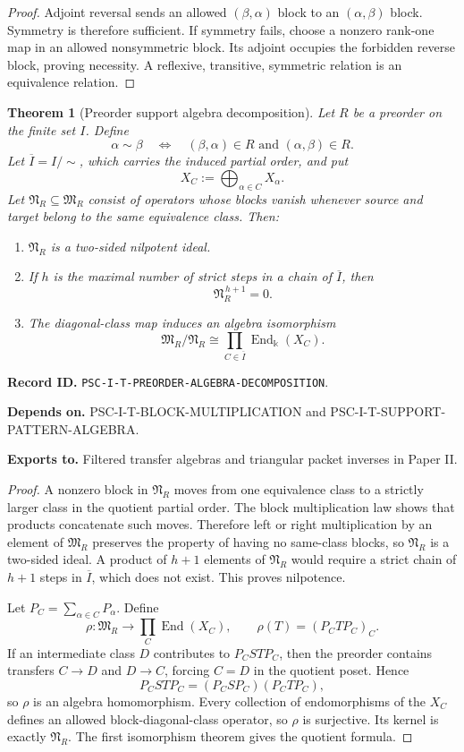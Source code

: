 \documentclass[11pt]{article}
\newtheorem{theorem}{Theorem}[section]
\theoremstyle{definition}
\theoremstyle{remark}
\newcommand{\bbk}{\Bbbk}
\newcommand{\End}{\operatorname{End}}
\newcommand{\RecordID}[1]{\par\smallskip\noindent\begingroup\footnotesize\color{PSCGray}\raggedright\textbf{Record ID.} \nolinkurl{#1}.\par\endgroup}
\newcommand{\Depends}[1]{\par\noindent\begingroup\footnotesize\color{PSCGray}\raggedright\textbf{Depends on.} #1\par\endgroup}
\newcommand{\Exports}[1]{\par\noindent\begingroup\footnotesize\color{PSCGray}\raggedright\textbf{Exports to.} #1\par\endgroup}
\begin{document}
\begin{proof}
Adjoint reversal sends an allowed $(\beta,\alpha)$ block to an $(\alpha,\beta)$ block.  Symmetry is therefore sufficient.  If symmetry fails, choose a nonzero rank-one map in an allowed nonsymmetric block.  Its adjoint occupies the forbidden reverse block, proving necessity.  A reflexive, transitive, symmetric relation is an equivalence relation.
\end{proof}

\begin{theorem}[Preorder support algebra decomposition]
\label{thm:preorder-decomposition}
Let $R$ be a preorder on the finite set $I$.  Define
\[
\alpha\sim\beta
\quad\Longleftrightarrow\quad
(\beta,\alpha)\in R\text{ and }(\alpha,\beta)\in R.
\]
Let $\overline I=I/{\sim}$, which carries the induced partial order, and put
\[
X_C:=\bigoplus_{\alpha\in C}X_\alpha.
\]
Let $\mathfrak N_R\subseteq\mathfrak M_R$ consist of operators whose blocks vanish whenever source and target belong to the same equivalence class.  Then:
\begin{enumerate}[label=(\roman*)]
\item $\mathfrak N_R$ is a two-sided nilpotent ideal.
\item If $h$ is the maximal number of strict steps in a chain of $\overline I$, then
\[
\mathfrak N_R^{\,h+1}=0.
\]
\item The diagonal-class map induces an algebra isomorphism
\[
\boxed{
\mathfrak M_R/\mathfrak N_R
\cong
\prod_{C\in\overline I}\End_{\bbk}(X_C).
}
\]
\end{enumerate}
\end{theorem}
\RecordID{PSC-I-T-PREORDER-ALGEBRA-DECOMPOSITION}
\Depends{PSC-I-T-BLOCK-MULTIPLICATION and PSC-I-T-SUPPORT-PATTERN-ALGEBRA.}
\Exports{Filtered transfer algebras and triangular packet inverses in Paper II.}

\begin{proof}
A nonzero block in $\mathfrak N_R$ moves from one equivalence class to a strictly larger class in the quotient partial order.  The block multiplication law shows that products concatenate such moves.  Therefore left or right multiplication by an element of $\mathfrak M_R$ preserves the property of having no same-class blocks, so $\mathfrak N_R$ is a two-sided ideal.  A product of $h+1$ elements of $\mathfrak N_R$ would require a strict chain of $h+1$ steps in $\overline I$, which does not exist.  This proves nilpotence.

Let $P_C=\sum_{\alpha\in C}P_\alpha$.  Define
\[
\rho:\mathfrak M_R\longrightarrow\prod_C\End(X_C),
\qquad
\rho(T)=(P_CTP_C)_C.
\]
If an intermediate class $D$ contributes to $P_CSTP_C$, then the preorder contains transfers $C\to D$ and $D\to C$, forcing $C=D$ in the quotient poset.  Hence
\[
P_CSTP_C=(P_CSP_C)(P_CTP_C),
\]
so $\rho$ is an algebra homomorphism.  Every collection of endomorphisms of the $X_C$ defines an allowed block-diagonal-class operator, so $\rho$ is surjective.  Its kernel is exactly $\mathfrak N_R$.  The first isomorphism theorem gives the quotient formula.
\end{proof}
\end{document}
